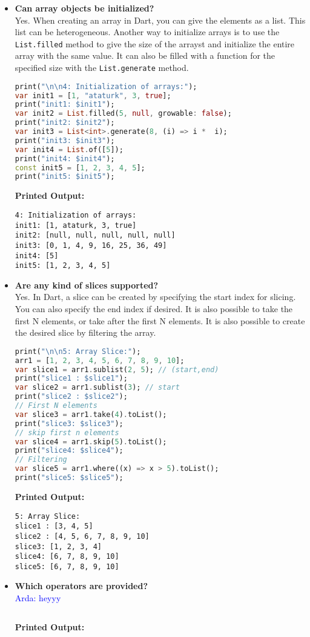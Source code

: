 \documentclass{article}
\newcommand{\arda}[1]{\textcolor{blue}{Arda: #1}}
\begin{document}
\begin{itemize}
\item \textbf{Can array objects be initialized?} \\
Yes. When creating an array in Dart, you can give the elements as a list. This list can be heterogeneous. Another way to initialize arrays is to use the \texttt{List.filled} method to give the size of the arrayst and initialize the entire array with the same value. It can also be filled with a function for the specified size with the \texttt{List.generate} method.
\begin{lstlisting}[language=Dart]
print("\n\n4: Initialization of arrays:");
var init1 = [1, "ataturk", 3, true];
print("init1: $init1");
var init2 = List.filled(5, null, growable: false);
print("init2: $init2"); 
var init3 = List<int>.generate(8, (i) => i *  i); 
print("init3: $init3");
var init4 = List.of([5]);
print("init4: $init4");
const init5 = [1, 2, 3, 4, 5];
print("init5: $init5");
\end{lstlisting}
\textbf{Printed Output:}
\begin{verbatim}
4: Initialization of arrays:
init1: [1, ataturk, 3, true]
init2: [null, null, null, null, null]
init3: [0, 1, 4, 9, 16, 25, 36, 49]
init4: [5]
init5: [1, 2, 3, 4, 5]
\end{verbatim}


\item \textbf{Are any kind of slices supported?} \\
Yes. In Dart, a slice can be created by specifying the start index for slicing. You can also specify the end index if desired. It is also possible to take the first N elements, or take after the first N elements. It is also possible to create the desired slice by filtering the array. 
\begin{lstlisting}[language=Dart]
print("\n\n5: Array Slice:");
arr1 = [1, 2, 3, 4, 5, 6, 7, 8, 9, 10];
var slice1 = arr1.sublist(2, 5); // (start,end)
print("slice1 : $slice1"); 
var slice2 = arr1.sublist(3); // start
print("slice2 : $slice2");
// First N elements
var slice3 = arr1.take(4).toList();
print("slice3: $slice3");
// skip first n elements
var slice4 = arr1.skip(5).toList();
print("slice4: $slice4");
// Filtering
var slice5 = arr1.where((x) => x > 5).toList();
print("slice5: $slice5");
\end{lstlisting}
\textbf{Printed Output:}
\begin{verbatim}
5: Array Slice:
slice1 : [3, 4, 5]
slice2 : [4, 5, 6, 7, 8, 9, 10]
slice3: [1, 2, 3, 4]
slice4: [6, 7, 8, 9, 10]
slice5: [6, 7, 8, 9, 10]
\end{verbatim}



\item \textbf{Which operators are provided?} \\
\arda{heyyy}
\begin{lstlisting}[language=Dart]
\end{lstlisting}
\textbf{Printed Output:}
\begin{verbatim}
\end{verbatim}   
\end{itemize}
\end{document}
